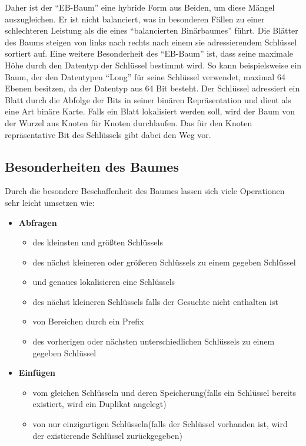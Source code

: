 \documentclass[a4paper,11pt,oneside,%
headsepline,												%
footsepline,												%
bibtotocnumbered									%
]{scrreprt}
\begin{document}
Daher ist der \enquote{EB-Baum} eine hybride Form aus Beiden, um diese Mängel auszugleichen. Er ist nicht balanciert, was in besonderen Fällen zu einer schlechteren Leistung als die eines \enquote{balancierten Binärbaumes} führt. Die Blätter des Baums steigen von links nach rechts nach einem sie adressierendem Schlüssel sortiert auf.
Eine weitere Besonderheit des \enquote{EB-Baum} ist, dass seine maximale Höhe durch den Datentyp der Schlüssel bestimmt wird. So kann beispielsweise ein Baum, der den Datentypen \enquote{Long} für seine Schlüssel verwendet, maximal 64 Ebenen besitzen, da der Datentyp aus 64 Bit besteht. Der Schlüssel adressiert ein Blatt durch die Abfolge der Bits in seiner binären Repräsentation und dient als eine Art binäre Karte. Falls ein Blatt lokalisiert werden soll, wird der Baum von der Wurzel aus Knoten für Knoten durchlaufen. Das für den Knoten repräsentative Bit des Schlüssels gibt dabei den Weg vor.

\subsection{Besonderheiten des Baumes}
Durch die besondere Beschaffenheit des Baumes lassen sich viele Operationen sehr leicht umsetzen wie:
\begin{itemize}
	\item \textbf{Abfragen}
	\begin{itemize}
		\item des kleinsten und größten Schlüssels
		\item des nächst kleineren oder größeren Schlüssels zu einem gegeben Schlüssel
		\item und genaues lokalisieren eine Schlüssels
		\item des nächst kleineren Schlüssels falls der Gesuchte nicht enthalten ist
		\item von Bereichen durch ein Prefix
		\item des vorherigen oder nächsten unterschiedlichen Schlüssels zu einem gegeben Schlüssel
	\end{itemize}
	\item \textbf{Einfügen}
	\begin{itemize}
		\item vom gleichen Schlüsseln und deren Speicherung(falls ein Schlüssel bereits existiert, wird ein Duplikat angelegt)
		\item von nur einzigartigen Schlüsseln(falls der Schlüssel vorhanden ist, wird der  existierende Schlüssel zurückgegeben)
	\end{itemize}
\end{itemize}
\end{document}
